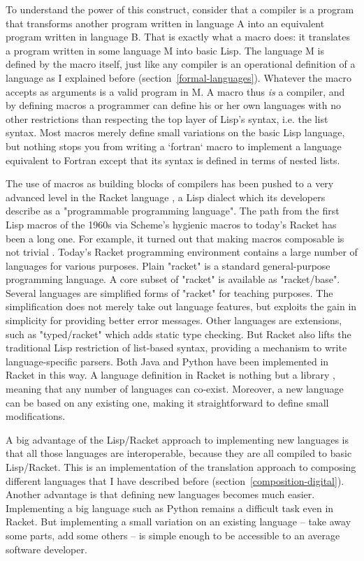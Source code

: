 To understand the power of this construct, consider that a compiler is a program that transforms another program written in language A into an equivalent program written in language B. That is exactly what a macro does: it translates a program written in some language M into basic Lisp. The language M is defined by the macro itself, just like any compiler is an operational definition of a language as I explained before (section~\ref{formal-languages}). Whatever the macro accepts as arguments is a valid program in M. A macro thus \textit{is} a compiler, and by defining macros a programmer can define his or her own languages with no other restrictions than respecting the top layer of Lisp's syntax, i.e. the list syntax. Most macros merely define small variations on the basic Lisp language, but nothing stops you from writing a `fortran` macro to implement a language equivalent to Fortran except that its syntax is defined in terms of nested lists.

The use of macros as building blocks of compilers has been pushed to a very advanced level in the Racket language \cite{plt-tr1}, a Lisp dialect which its developers describe as a "programmable programming language". The path from the first Lisp macros of the 1960s via Scheme's hygienic macros to today's Racket has been a long one. For example, it turned out that making macros composable is not trivial \cite{flatt_composable_2002}. Today's Racket programming environment contains a large number of languages for various purposes. Plain "racket" is a standard general-purpose programming language. A core subset of "racket" is available as "racket/base". Several languages are simplified forms of "racket" for teaching purposes. The simplification does not merely take out language features, but exploits the gain in simplicity for providing better error messages. Other languages are extensions, such as "typed/racket" which adds static type checking. But Racket also lifts the traditional Lisp restriction of list-based syntax, providing a mechanism to write language-specific parsers. Both Java and Python have been implemented in Racket in this way. A language definition in Racket is nothing but a library \cite{tobin-hochstadt_languages_2011}, meaning that any number of languages can co-exist. Moreover, a new language can be based on any existing one, making it straightforward to define small modifications.

A big advantage of the Lisp/Racket approach to implementing new languages is that all those languages are interoperable, because they are all compiled to basic Lisp/Racket. This is an implementation of the translation approach to composing different languages that I have described before (section~\ref{composition-digital}). Another advantage is that defining new languages becomes much easier. Implementing a big language such as Python remains a difficult task even in Racket. But implementing a small variation on an existing language -- take away some parts, add some others -- is simple enough to be accessible to an average software developer.

